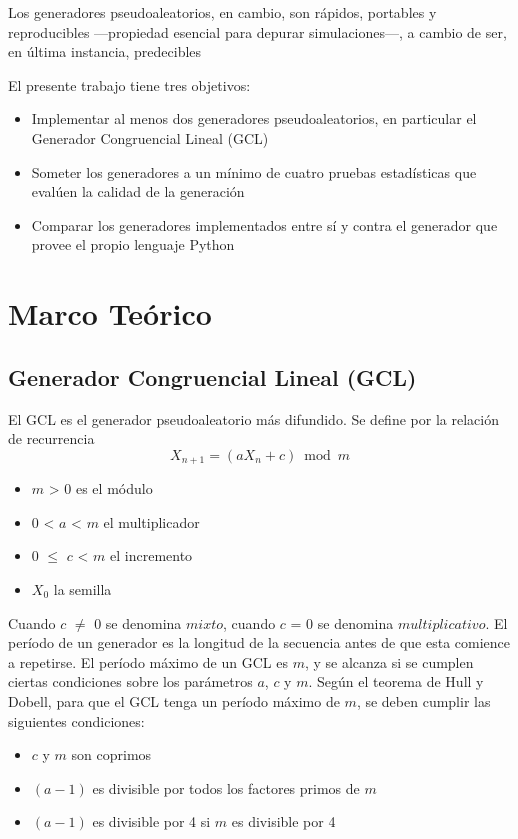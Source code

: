 \documentclass{article}
\begin{document}
Los generadores pseudoaleatorios, en cambio, son rápidos, portables y reproducibles —propiedad esencial para depurar simulaciones—, a cambio de ser, en última instancia, predecibles

El presente trabajo tiene tres objetivos:
\begin{itemize}
  \item Implementar al menos dos generadores pseudoaleatorios, en particular el Generador Congruencial Lineal (GCL)
  \item Someter los generadores a un mínimo de cuatro pruebas estadísticas que evalúen la calidad de la generación
  \item Comparar los generadores implementados entre sí y contra el generador que provee el propio lenguaje Python
\end{itemize}

\section{Marco Teórico}
\subsection{Generador Congruencial Lineal (GCL)}
El GCL es el generador pseudoaleatorio más difundido. Se define por la relación de recurrencia
\begin{equation}
X_{n+1} = (aX_n + c) \bmod m
\end{equation}
\begin{itemize}
  \item $m$ > 0 es el módulo
  \item 0 < $a$ < $m$ el multiplicador
  \item 0 \(\le \) $c$ < $m$ el incremento
  \item $X_0$ la semilla
\end{itemize}

Cuando $c$ \(\neq \) 0 se denomina $mixto$, cuando $c$ = 0 se denomina $multiplicativo$. 
El período de un generador es la longitud de la secuencia antes de que esta comience a repetirse. El período máximo de un GCL es $m$, y se alcanza si se cumplen ciertas condiciones sobre los parámetros $a$, $c$ y $m$.
Según el teorema de Hull y Dobell, para que el GCL tenga un período máximo de $m$, se deben cumplir las siguientes condiciones:
\begin{itemize}
  \item $c$ y $m$ son coprimos
  \item $(a-1)$ es divisible por todos los factores primos de $m$
  \item $(a-1)$ es divisible por 4 si $m$ es divisible por 4
\end{itemize}
\end{document}

